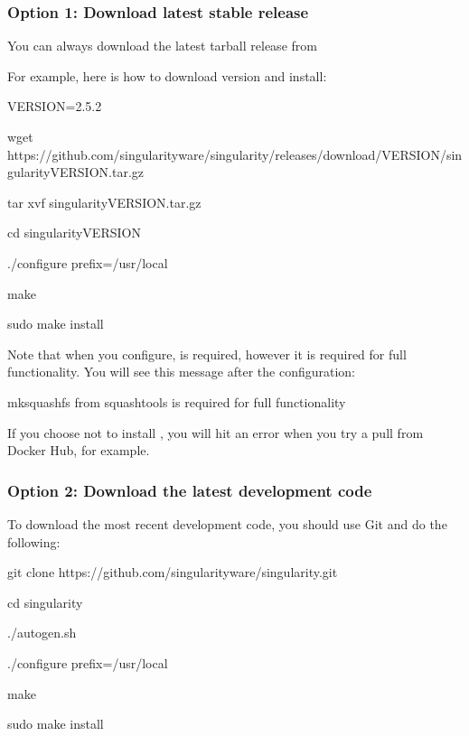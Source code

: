 \documentclass[letterpaper,10pt,english]{sphinxmanual}
\begin{document}
\subsubsection{Option 1: Download latest stable release}
\label{\detokenize{installation:option-1-download-latest-stable-release}}
You can always download the latest tarball release from 

For example, here is how to download version  and install:

%
\begin{sphinxVerbatim}[commandchars=\\\{\}]
VERSION=2.5.2

wget https://github.com/singularityware/singularity/releases/download/\PYGZdl{}VERSION/singularity\PYGZhy{}\PYGZdl{}VERSION.tar.gz

tar xvf singularity\PYGZhy{}\PYGZdl{}VERSION.tar.gz

cd singularity\PYGZhy{}\PYGZdl{}VERSION

./configure \PYGZhy{}\PYGZhy{}prefix=/usr/local

make

sudo make install
\end{sphinxVerbatim}

Note that when you configure,  is  required, however it is required for full functionality. You will see this message after the configuration:

%
\begin{sphinxVerbatim}[commandchars=\\\{\}]
mksquashfs from squash\PYGZhy{}tools is required for full functionality
\end{sphinxVerbatim}

If you choose not to install , you will hit an error when you try a pull from Docker Hub, for example.


\subsubsection{Option 2: Download the latest development code}
\label{\detokenize{installation:option-2-download-the-latest-development-code}}
To download the most recent development code, you should use Git and do the following:

%
\begin{sphinxVerbatim}[commandchars=\\\{\}]
git clone https://github.com/singularityware/singularity.git

cd singularity

./autogen.sh

./configure \PYGZhy{}\PYGZhy{}prefix=/usr/local

make

sudo make install
\end{sphinxVerbatim}
\end{document}
